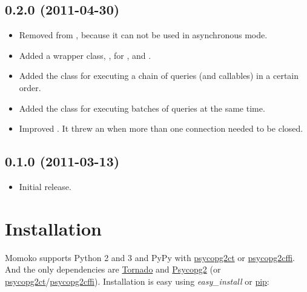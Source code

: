 \documentclass[letterpaper,10pt,english]{sphinxmanual}
\begin{document}
\section{0.2.0 (2011-04-30)}
\label{changelog:id5}\begin{itemize}
\item {} 
Removed  from , because it can not be used in asynchronous mode.

\item {} 
Added a wrapper class, , for ,  and .

\item {} 
Added the  class for executing a chain of queries (and callables)
in a certain order.

\item {} 
Added the  class for executing batches of queries at the same time.

\item {} 
Improved . It threw an  when more than one
connection needed to be closed.

\end{itemize}


\section{0.1.0 (2011-03-13)}
\label{changelog:id6}\begin{itemize}
\item {} 
Initial release.

\end{itemize}


\chapter{Installation}
\label{installation:installation}\label{installation:id1}\label{installation::doc}
Momoko supports Python 2 and 3 and PyPy with \href{http://pypi.python.org/pypi/psycopg2ct}{psycopg2ct} or \href{http://pypi.python.org/pypi/psycopg2cffi}{psycopg2cffi}.
And the only dependencies are \href{http://www.tornadoweb.org/}{Tornado} and \href{http://initd.org/psycopg/}{Psycopg2} (or \href{http://pypi.python.org/pypi/psycopg2ct}{psycopg2ct}/\href{http://pypi.python.org/pypi/psycopg2cffi}{psycopg2cffi}).
Installation is easy using \emph{easy\_install} or \href{http://www.pip-installer.org/}{pip}:
\end{document}
